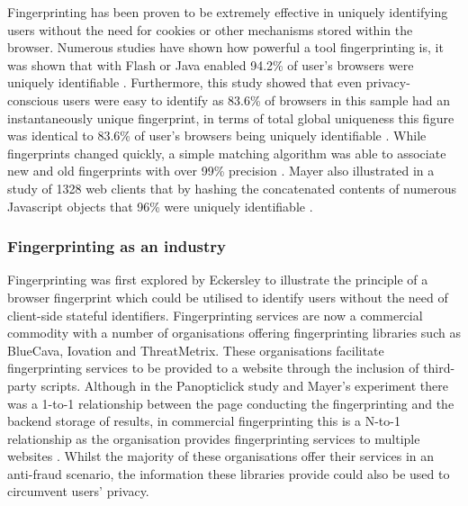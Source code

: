 \documentclass[12pt]{article}
\begin{document}
Fingerprinting has been proven to be extremely effective in uniquely identifying users without the need for cookies or other mechanisms stored within the browser. Numerous studies have shown how powerful a tool fingerprinting is, it was shown that with Flash or Java enabled 94.2\% of user's browsers were uniquely identifiable \parencite{uniqueBrowser}. Furthermore, this study showed that even privacy-conscious users were easy to identify as 83.6\% of browsers in this sample had an instantaneously unique fingerprint, in terms of total global uniqueness this figure was identical to 83.6\% of user's browsers being uniquely identifiable \parencite{uniqueBrowser}. While fingerprints changed quickly, a simple matching algorithm was able to associate new and old fingerprints with over 99\% precision \parencite{uniqueBrowser}. Mayer also illustrated in a study of 1328 web clients that by hashing the concatenated contents of numerous Javascript objects that 96\% were uniquely identifiable \parencite{mayer09}.

\subsubsection{Fingerprinting as an industry}
Fingerprinting was first explored by Eckersley \parencite{uniqueBrowser} to illustrate the principle of a browser fingerprint which could be utilised to identify users without the need of client-side stateful identifiers. Fingerprinting services are now a commercial commodity with a number of organisations offering fingerprinting libraries such as BlueCava, Iovation and ThreatMetrix. These organisations facilitate fingerprinting services to be provided to a website through the inclusion of third-party scripts. Although in the Panopticlick study \parencite{uniqueBrowser} and Mayer's experiment \parencite{mayer09} there was a 1-to-1 relationship between the page conducting the fingerprinting and the backend storage of results, in commercial fingerprinting this is a N-to-1 relationship as the organisation provides fingerprinting services to multiple websites \parencite{cookielessMonster}. Whilst the majority of these organisations offer their services in an anti-fraud scenario, the information these libraries provide could also be used to circumvent users' privacy.

\end{document}
